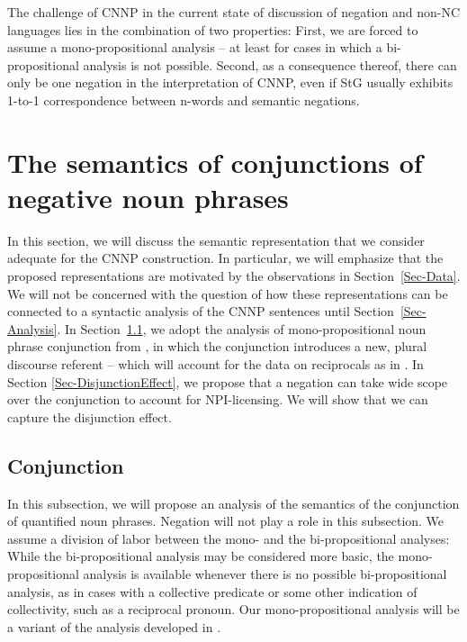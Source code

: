 \documentclass[output=paper]{langsci/langscibook}
\begin{document}
\begin{sloppypar}
  The challenge of CNNP in the current state of discussion of negation
  and non-NC languages lies in the combination of two properties:
  First, we are forced to assume a mono-propositional analysis -- at
  least for cases in which a bi-propositional analysis is not
  possible. Second, as a consequence thereof, there can only be one
  negation in the interpretation of CNNP, even if StG usually exhibits
  1-to-1 correspondence between n-words and semantic negations.
\end{sloppypar}


\section{The semantics of conjunctions of negative noun phrases}
\label{Sec-Semantics}

In this section, 
we will discuss the semantic representation that we consider adequate for the CNNP construction. 
In particular, we will emphasize that the proposed representations are motivated by the observations in Section~\ref{Sec-Data}.
We will not be concerned with the question of how these representations can be connected to a syntactic analysis of the CNNP sentences until Section~\ref{Sec-Analysis}.
%
In Section~\ref{Sec-Conjunction},
we adopt the analysis of mono-propositional noun phrase conjunction from \citet{Chaves:07}, in which 
 the conjunction introduces a new, plural discourse referent -- which will account for the data on reciprocals as in .
In Section \ref{Sec-DisjunctionEffect}, we propose that a negation can take wide scope over the conjunction to account for NPI-licensing. 
We will show that we can capture the disjunction effect. 

\subsection{Conjunction}
\label{Sec-Conjunction}

In this subsection, we will propose an analysis of the semantics of the conjunction of quantified noun phrases.
Negation will not play a role in this subsection.
We assume a division of labor between the mono- and the bi-propositional analyses: 
While the bi-propositional analysis may be considered more basic, the mono-propositional analysis is available whenever there is no possible bi-propositional analysis,
as in 
cases with a collective predicate or some other indication of collectivity, such as a reciprocal pronoun. 
Our mono-propositional analysis will be a variant of the analysis developed in \citet{Chaves:07}. 
\end{document}

